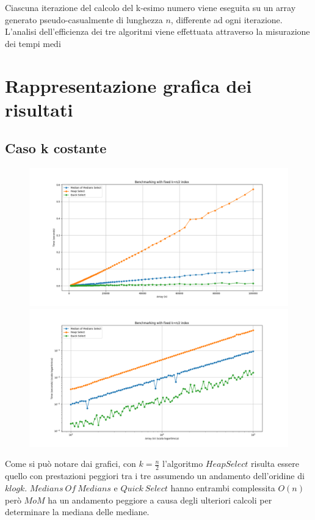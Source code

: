 \documentclass[a4paper]{article}
\begin{document}
Ciascuna iterazione del calcolo del k-esimo numero viene eseguita su un array generato pseudo-casualmente di lunghezza \( n \), differente ad ogni iterazione.
L'analisi dell'efficienza dei tre algoritmi viene effettuata attraverso la misurazione dei tempi medi\\


\section{Rappresentazione grafica dei risultati}
\label{sec:grafici}

\subsection{Caso k costante}
\begin{figure}[h]
            \centering
            \includegraphics[width=.83\textwidth]{graphs/k_const_n.png}
            \includegraphics[width=.83\textwidth]{graphs/k_const_2xlog.png}
\end{figure}
Come si può notare dai grafici, con $k=\frac{n}{2}$ l'algoritmo $HeapSelect$ risulta essere quello con prestazioni peggiori tra i tre assumendo un andamento dell'oridine di $klogk$.
$Medians\ Of\ Medians$ e $Quick\ Select$ hanno entrambi complessita $O(n)$ però $MoM$ ha un andamento peggiore a causa degli ulteriori calcoli per determinare la mediana delle mediane.\\
\end{document}
